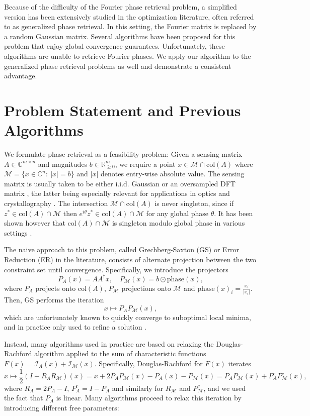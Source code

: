 \documentclass[journal]{IEEEtran}
\theoremstyle{definition}
\theoremstyle{remark}
\theoremstyle{definition}
\theoremstyle{problem}
\theoremstyle{definition}
\newcommand{\col}{\text{col}}
\newcommand{\phase}{\text{phase}}
\newcommand{\RR}{\mathbb{R} }
\newcommand{\II}{\mathcal{I} }
\newcommand{\CC}{\mathbb{C}}
\newcommand{\MM}{\mathcal{M}}
\newcommand{\TODO}[1]{{\color{red}{[#1]}}}
\begin{document}
Because of the difficulty of the Fourier phase retrieval problem, a simplified version has been extensively studied in the optimization literature, often referred to as generalized phase retrieval. In this setting, the Fourier matrix is replaced by a random Gaussian matrix. Several algorithms have been proposed for this problem that enjoy global convergence guarantees. Unfortunately, these algorithms are unable to retrieve Fourier phases. We apply our algorithm to the generalized phase retrieval problems as well and demonstrate a consistent advantage.

\section{Problem Statement and Previous Algorithms}
We formulate phase retrieval as a feasibility problem: Given a sensing matrix $A\in\CC^{m\times n}$ and magnitudes $b\in\RR^{m}_{\geq 0}$, we require a point $x\in\MM\cap \col(A)$ where $\MM=\{x\in\CC^n:\ |x|=b\}$ and $|x|$ denotes entry-wise absolute value. The sensing matrix is usually taken to be either i.i.d. Gaussian or an oversampled DFT matrix \cite{Bendory2017}, the latter being especially relevant for applications in optics and crystallography \cite{Elser2017, Luke2005}. The intersection $\MM\cap\col(A)$ is never singleton, since if $z^*\in\col(A)\cap\MM$ then $e^{i\theta}z^*\in\col(A)\cap \MM$ for any global phase $\theta$. It has been shown however that $\col(A)\cap\MM$ is singleton modulo global phase in various settings \cite{Bandeira2014,Bendory2017,Conca2015}. \TODO{Expand on this?}

The naive approach to this problem, called Grechberg-Saxton (GS) or Error Reduction (ER) in the literature, consists of alternate projection between the two constraint set until convergence. Specifically, we introduce the projectors 
\begin{equation}\label{eq:projections}
    P_A(x) = AA^{\dagger}x, \quad P_{\MM}(x)=b\odot \phase(x),
\end{equation}
where $P_A$ projects onto $\col(A)$, $P_{\MM}$ projections onto $\MM$ and $\phase(x)_i=\frac{x_i}{|x_i|}$. Then, GS performs the iteration 
\begin{equation}\label{eq:GS}
    x\mapsto P_AP_{\MM}(x),    
\end{equation}
which are unfortunately known to quickly converge to suboptimal local minima, and in practice only used to refine a solution \cite{Elser2017, Marchesini2007}. 

Instead, many algorithms used in practice are based on relaxing the Douglas-Rachford algorithm applied to the sum of characteristic functions $F(x) = \II_{A}(x)+\II_{\MM}(x)$. Specifically, Douglas-Rachford for $F(x)$ iterates \begin{equation}\label{eq:Doug_Rach}
    x\mapsto \frac{1}{2}(I+R_AR_{\MM})(x) = x + 2P_AP_{\MM}(x) - P_A(x) - P_{\MM}(x) = P_AP_{\MM}(x) + P_A^cP_{\MM}^c(x),
\end{equation} 
where $R_A = 2P_A-I$, $P_A^c=I-P_A$ and similarly for $R_{\MM}$ and $P_{\MM}^c$, and we used the fact that $P_A$ is linear. Many algorithms proceed to relax this iteration by introducing different free parameters\TODO{Rewrite in terms of reflections?}:
\end{document}
